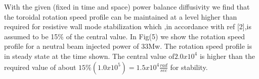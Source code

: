        With the given (fixed in time and space) power balance
       diffusivity we find that the toroidal rotation speed profile
       can be maintained at a level higher than required for resistive 
       wall mode stabilization which ,in accordance with ref [2],is
       assumed to be 15\% of  the central value.  In Fig(5) we show
       the rotation speed profile for a  neutral 
       beam injected power of  33Mw.  The rotation speed profile 
       is in steady state at the time shown. The central
       value of$ 2.0x10^4 $ is higher than the required value of
       about $15\% (1.0x10^5) = 1.5x10^4 \frac{rad}{sec}$ for
       stability.
        \begin{center}
          \end{center}
        \begin{center}
          \end{center}
        \pagebreak
        
